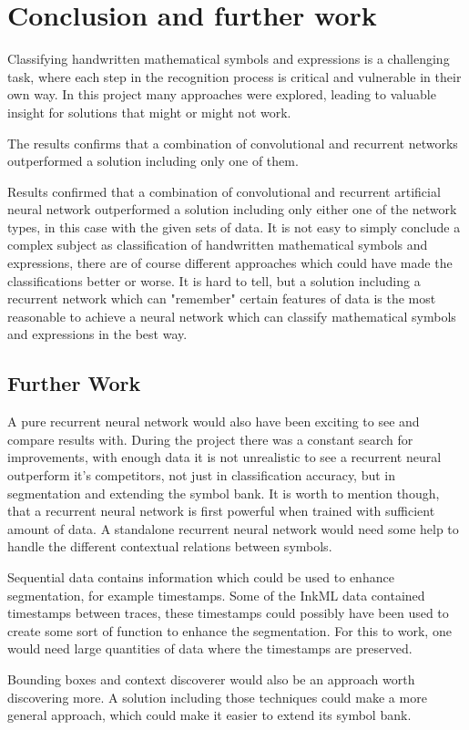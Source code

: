 \chapter{Conclusion and further work}
Classifying handwritten mathematical symbols and expressions is a challenging task, where each step in the recognition process is critical and vulnerable in their own way. In this project many approaches were explored, leading to valuable insight for solutions that might or might not work. 

The results confirms that a combination of convolutional and recurrent networks outperformed a solution including only one of them. 

Results confirmed that a combination of convolutional and recurrent artificial neural network outperformed a solution including only either one of the network types, in this case with the given sets of data. It is not easy to simply conclude a complex subject as classification of handwritten mathematical symbols and expressions, there are of course different approaches which could have made the classifications better or worse. It is hard to tell, but a solution including a recurrent network which can "remember" certain features of data is the most reasonable to achieve a neural network which can classify mathematical symbols and expressions in the best way.


\section{Further Work}
A pure recurrent neural network would also have been exciting to see and compare results with. During the project there was a constant search for improvements, with enough data it is not unrealistic to see a recurrent neural outperform it's competitors, not just in classification accuracy, but in segmentation and extending the symbol bank. It is worth to mention though, that a recurrent neural network is first powerful when trained with sufficient amount of data. A standalone recurrent neural network would need some help to handle the different contextual relations between symbols.

Sequential data contains information which could be used to enhance segmentation, for example timestamps. Some of the InkML data contained timestamps between traces, these timestamps could possibly have been used to create some sort of function to enhance the segmentation. For this to work, one would need large quantities of data where the timestamps are preserved.

Bounding boxes and context discoverer would also be an approach worth discovering more. A solution including those techniques could make a more general approach, which could make it easier to extend its symbol bank. 


